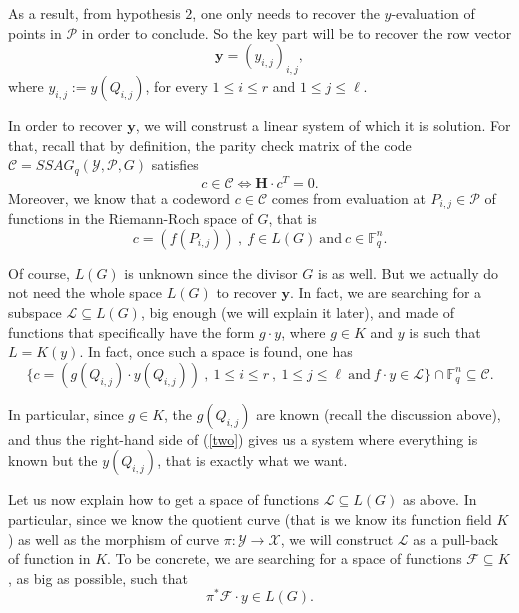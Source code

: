 \documentclass[10pt]{article}
\newcommand{\s}{\vspace{0.3cm}}
\newcommand{\cd}{\cdot}
\newcommand{\fq}{\mathbb{F}_q}
\newcommand{\su}{\subseteq}
\newcommand{\X}{\mathcal{X}}
\newcommand{\Y}{\mathcal{Y}}
\newcommand{\PR}{\mathcal{P}}
\begin{document}
As a result, from hypothesis $2$, one only needs to recover the $y$-evaluation of points in $\PR$ in order to conclude. So the key part will be to recover the row vector
\begin{equation}
\textbf{y} = (y_{i,j})_{i,j},
\end{equation}
where $y_{i,j} := y(Q_{i,j})$, for every $1 \leq i \leq r$ and $1 \leq j \leq \ell$.

\s

In order to recover $\mathbf{y}$, we will construst a linear system of which it is solution. For that, recall that by definition, the parity check matrix of the code $\mathcal{C}=SSAG_q(\Y,\PR,G)$ satisfies
\begin{equation} \label{two}
c \in \mathcal{C} \iff \mathbf{H} \cd c^T = 0.
\end{equation}
Moreover, we know that a codeword $c \in \mathcal{C}$ comes from evaluation at $P_{i,j} \in \PR$ of functions in the Riemann-Roch space of $G$, that is
\[c = (f(P_{i,j})) \ , \ f \in L(G) \ \textrm{and} \ c \in \fq^n.\]

Of course, $L(G)$ is unknown since the divisor $G$ is as well. But we actually do not need the whole space $L(G)$ to recover $\mathbf{y}$. In fact, we are searching for a subspace $\mathcal{L} \su L(G)$, big enough (we will explain it later), and made of functions that specifically have the form $g \cd y$, where $g \in K$ and $y$ is such that $L=K(y)$. In fact, once such a space is found, one has 
\[\{c= (g(Q_{i,j}) \cd y(Q_{i,j})) \ , \ 1 \leq i \leq r \ , \ 1 \leq j \leq \ell \ \textrm{and} \ f\cd y \in \mathcal{L}\} \cap \fq^n \su \mathcal{C}.\] 

In particular, since $g \in K$, the $g(Q_{i,j})$ are known (recall the discussion above), and thus the right-hand side of (\ref{two}) gives us a system where everything is known but the $y(Q_{i,j})$, that is exactly what we want.

\s

Let us now explain how to get a space of functions $\mathcal{L} \su L(G)$ as above. In particular, since we know the quotient curve (that is we know its function field $K$) as well as the morphism of curve $\pi : \Y \rightarrow \X$, we will construct $\mathcal{L}$ as a pull-back of function in $K$. To be concrete, we are searching for a space of functions $\mathcal{F} \su K$, as big as possible, such that 
\begin{equation} \label{three}
\pi^*\mathcal{F} \cd y \in L(G). 
\end{equation}
\end{document}
